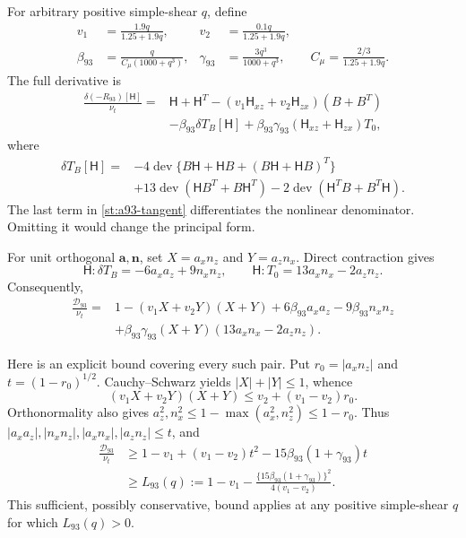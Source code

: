 \documentclass[11pt,a4paper]{article}
\numberwithin{equation}{section}
\newcommand{\nut}{\nu_t}
\DeclareMathOperator{\dev}{dev}
\begin{document}
For arbitrary positive simple-shear $q$, define
\begin{equation}
 \begin{aligned}
 v_1&=\frac{1.9q}{1.25+1.9q},&
 v_2&=\frac{0.1q}{1.25+1.9q},\\
 \beta_{93}&=\frac{q}{C_\mu(1000+q^3)},&
 \gamma_{93}&=\frac{3q^3}{1000+q^3},
 \qquad C_\mu=\frac{2/3}{1.25+1.9q}.
 \end{aligned}
 \label{st:a93-coefficients}
\end{equation}
The full derivative is
\begin{equation}
 \begin{aligned}
 \frac{\delta(-R_{93})[\mathsf H]}{\nut}
 ={}&\mathsf H+\mathsf H^T
 -(v_1\mathsf H_{xz}+v_2\mathsf H_{zx})(B+B^T)\\
 &-\beta_{93}\delta T_B[\mathsf H]
 +\beta_{93}\gamma_{93}
       (\mathsf H_{xz}+\mathsf H_{zx})T_0 ,
 \end{aligned}
 \label{st:a93-tangent}
\end{equation}
where
\begin{equation}
 \begin{aligned}
 \delta T_B[\mathsf H]={}&
 -4\dev\{B\mathsf H+\mathsf H B+
                   (B\mathsf H+\mathsf H B)^T\}\\
 &+13\dev(\mathsf H B^T+B\mathsf H^T)
 -2\dev(\mathsf H^TB+B^T\mathsf H).
 \end{aligned}
 \label{st:a93-polynomial-derivative}
\end{equation}
The last term in \cref{st:a93-tangent} differentiates the nonlinear
denominator. Omitting it would change the principal form.

For unit orthogonal $\boldsymbol a,\boldsymbol n$, set
$X=a_xn_z$ and $Y=a_zn_x$. Direct contraction gives
\[
 \mathsf H:\delta T_B=-6a_xa_z+9n_xn_z,\qquad
 \mathsf H:T_0=13a_xn_x-2a_zn_z.
\]
Consequently,
\begin{equation}
 \begin{aligned}
 \frac{\mathcal D_{93}}{\nut}
 ={}&1-(v_1X+v_2Y)(X+Y)
       +6\beta_{93}a_xa_z-9\beta_{93}n_xn_z\\
 &+\beta_{93}\gamma_{93}(X+Y)
                      (13a_xn_x-2a_zn_z).
 \end{aligned}
 \label{st:a93-rank-one}
\end{equation}

Here is an explicit bound covering every such pair. Put
$r_0=|a_xn_z|$ and $t=(1-r_0)^{1/2}$. Cauchy--Schwarz yields
$|X|+|Y|\le1$, whence
\[
 (v_1X+v_2Y)(X+Y)\le v_2+(v_1-v_2)r_0.
\]
Orthonormality also gives
$a_z^2,n_x^2\le1-\max(a_x^2,n_z^2)\le1-r_0$.
Thus $|a_xa_z|,|n_xn_z|,|a_xn_x|,|a_zn_z|\le t$, and
\begin{equation}
 \begin{aligned}
 \frac{\mathcal D_{93}}{\nut}
 &\ge1-v_1+(v_1-v_2)t^2
              -15\beta_{93}(1+\gamma_{93})t\\
 &\ge L_{93}(q):=
 1-v_1-
 \frac{\{15\beta_{93}(1+\gamma_{93})\}^2}{4(v_1-v_2)}.
 \end{aligned}
 \label{st:a93-q-bound}
\end{equation}
This sufficient, possibly conservative, bound applies at any positive
simple-shear $q$ for which $L_{93}(q)>0$.
\end{document}
